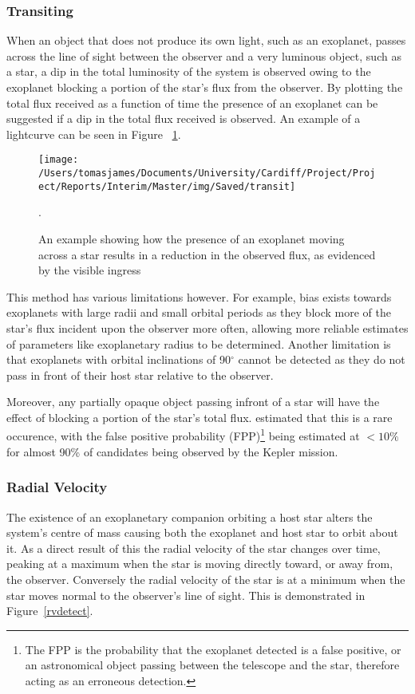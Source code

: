 \documentclass[twoside]{article}
\begin{document}
\begin{multicols}{2}
\subsubsection{Transiting}
When an object that does not produce its own light, such as an exoplanet, passes across the line of sight between the observer and a very luminous object, such as a star, a dip in the total luminosity of the system is observed owing to the exoplanet blocking a portion of the star's flux from the observer. By plotting the total flux received as a function of time the presence of an exoplanet can be suggested if a dip in the total flux received is observed. An example of a lightcurve can be seen in Figure ~\ref{Transit}.

\begin{figure}[H]
\centering
    \texttt{[image: /Users/tomasjames/Documents/University/Cardiff/Project/Project/Reports/Interim/Master/img/Saved/transit]}
\caption[An example showing how the presence of an exoplanet moving across a star results in a reduction in the observed flux, as evidenced by the visible ingress.]{An example showing how the presence of an exoplanet moving across a star results in a reduction in the observed flux, as evidenced by the visible ingress \citep{transitimg}}.\label{Transit}
\end{figure}

This method has various limitations however. For example, bias exists towards exoplanets with large radii and small orbital periods as they block more of the star’s flux incident upon the observer more often, allowing more reliable estimates of parameters like exoplanetary radius to be determined. Another limitation is that exoplanets with orbital inclinations of 90$^\circ$ cannot be detected as they do not pass in front of their host star relative to the observer.

Moreover, any partially opaque object passing infront of a star will have the effect of blocking a portion of the star's total flux. \cite{false} estimated that this is a rare occurence, with the false positive probability (FPP)\footnote{The FPP is the probability that the exoplanet detected is a false positive, or an astronomical object passing between the telescope and the star, therefore acting as an erroneous detection.} being estimated at $<10\%$ for almost 90\% of candidates being observed by the Kepler mission.

\subsubsection{Radial Velocity }
The existence of an exoplanetary companion orbiting a host star alters the system's centre of mass causing both the exoplanet and host star to orbit about it. As a direct result of this the radial velocity of the star changes over time, peaking at a maximum when the star is moving directly toward, or away from, the observer. Conversely the radial velocity of the star is at a minimum when the star moves normal to the observer’s line of sight. This is demonstrated in Figure~\ref{rvdetect}.


\end{multicols}
\end{document}
